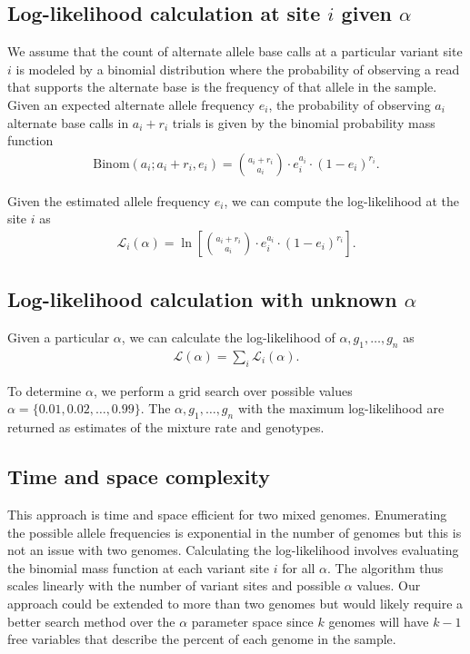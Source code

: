 \documentclass[12pt]{article}
\begin{document}
\subsection{Log-likelihood calculation at site $i$ given $\alpha$}
\label{sec:likelihood}
We assume that the count of alternate allele base calls at a particular variant site $i$ is modeled by a binomial distribution where the probability of observing a read that supports the alternate base is the frequency of that allele in the sample. 
Given an expected alternate allele frequency $e_i$, the probability of observing $a_i$ alternate base calls in $a_i+r_i$ trials is given by the binomial probability mass function
\begin{align}
\text{Binom}(a_i;a_i+r_i,e_i) = {a_i+r_i \choose a_i} \cdot e_i^{a_i} \cdot (1-e_i)^{r_i}.
\end{align}

Given the estimated allele frequency $e_i$, we can compute the log-likelihood at the site $i$ as
\begin{align}
\mathcal{L}_i(\alpha) = \ln{\left[ {a_i+r_i \choose a_i} \cdot e_i^{a_i} \cdot (1-e_i)^{r_i}\right]}.
\end{align}

\subsection{Log-likelihood calculation with unknown $\alpha$}
\label{sec:likelihood-unknown-alpha}
Given a particular $\alpha$, we can calculate the log-likelihood of $\alpha,g_1,\dots,g_n$ as 
\begin{align}
\mathcal{L}(\alpha) = \sum_i \mathcal{L}_i(\alpha).
\end{align}

To determine $\alpha$, we perform a grid search over possible values $\alpha = \{0.01,0.02,\dots,0.99\}$. The $\alpha,g_1,\dots,g_n$ with the maximum log-likelihood are returned as estimates of the mixture rate and genotypes.

\subsection{Time and space complexity}
This approach is time and space efficient for two mixed genomes. Enumerating the possible allele frequencies is exponential in the number of genomes but this is not an issue with two genomes. Calculating the log-likelihood involves evaluating the binomial mass function at each variant site $i$ for all $\alpha$. The algorithm thus scales linearly with the number of variant sites and possible $\alpha$ values. Our approach could be extended to more than two genomes but would likely require a better search method over the $\alpha$ parameter space since $k$ genomes will have $k-1$ free variables that describe the percent of each genome in the sample.
\end{document}
